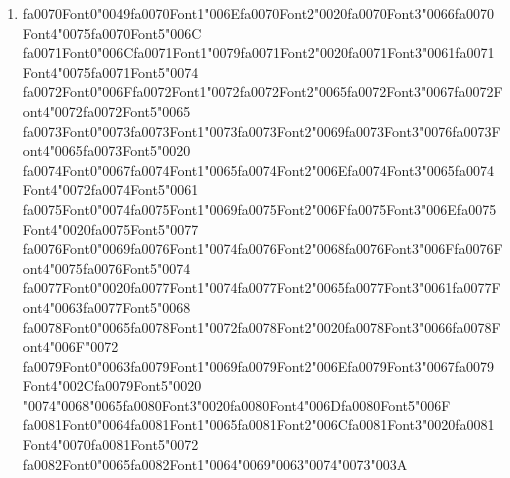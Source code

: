 \documentclass[11pt]{article}
\begin{document}
\begin{enumerate}[label=Q\arabic*., leftmargin=*]
\item {\csname fa0070Font0\endcsname\char"0049}{\csname fa0070Font1\endcsname\char"006E}{\csname fa0070Font2\endcsname\char"0020}{\csname fa0070Font3\endcsname\char"0066}{\csname fa0070Font4\endcsname\char"0075}{\csname fa0070Font5\endcsname\char"006C} {\csname fa0071Font0\endcsname\char"006C}{\csname fa0071Font1\endcsname\char"0079}{\csname fa0071Font2\endcsname\char"0020}{\csname fa0071Font3\endcsname\char"0061}{\csname fa0071Font4\endcsname\char"0075}{\csname fa0071Font5\endcsname\char"0074} {\csname fa0072Font0\endcsname\char"006F}{\csname fa0072Font1\endcsname\char"0072}{\csname fa0072Font2\endcsname\char"0065}{\csname fa0072Font3\endcsname\char"0067}{\csname fa0072Font4\endcsname\char"0072}{\csname fa0072Font5\endcsname\char"0065} {\csname fa0073Font0\endcsname\char"0073}{\csname fa0073Font1\endcsname\char"0073}{\csname fa0073Font2\endcsname\char"0069}{\csname fa0073Font3\endcsname\char"0076}{\csname fa0073Font4\endcsname\char"0065}{\csname fa0073Font5\endcsname\char"0020} {\csname fa0074Font0\endcsname\char"0067}{\csname fa0074Font1\endcsname\char"0065}{\csname fa0074Font2\endcsname\char"006E}{\csname fa0074Font3\endcsname\char"0065}{\csname fa0074Font4\endcsname\char"0072}{\csname fa0074Font5\endcsname\char"0061} {\csname fa0075Font0\endcsname\char"0074}{\csname fa0075Font1\endcsname\char"0069}{\csname fa0075Font2\endcsname\char"006F}{\csname fa0075Font3\endcsname\char"006E}{\csname fa0075Font4\endcsname\char"0020}{\csname fa0075Font5\endcsname\char"0077} {\csname fa0076Font0\endcsname\char"0069}{\csname fa0076Font1\endcsname\char"0074}{\csname fa0076Font2\endcsname\char"0068}{\csname fa0076Font3\endcsname\char"006F}{\csname fa0076Font4\endcsname\char"0075}{\csname fa0076Font5\endcsname\char"0074} {\csname fa0077Font0\endcsname\char"0020}{\csname fa0077Font1\endcsname\char"0074}{\csname fa0077Font2\endcsname\char"0065}{\csname fa0077Font3\endcsname\char"0061}{\csname fa0077Font4\endcsname\char"0063}{\csname fa0077Font5\endcsname\char"0068} {\csname fa0078Font0\endcsname\char"0065}{\csname fa0078Font1\endcsname\char"0072}{\csname fa0078Font2\endcsname\char"0020}{\csname fa0078Font3\endcsname\char"0066}{\csname fa0078Font4\endcsname\char"006F}{\char"0072} {\csname fa0079Font0\endcsname\char"0063}{\csname fa0079Font1\endcsname\char"0069}{\csname fa0079Font2\endcsname\char"006E}{\csname fa0079Font3\endcsname\char"0067}{\csname fa0079Font4\endcsname\char"002C}{\csname fa0079Font5\endcsname\char"0020} {\char"0074}{\char"0068}{\char"0065}{\csname fa0080Font3\endcsname\char"0020}{\csname fa0080Font4\endcsname\char"006D}{\csname fa0080Font5\endcsname\char"006F} {\csname fa0081Font0\endcsname\char"0064}{\csname fa0081Font1\endcsname\char"0065}{\csname fa0081Font2\endcsname\char"006C}{\csname fa0081Font3\endcsname\char"0020}{\csname fa0081Font4\endcsname\char"0070}{\csname fa0081Font5\endcsname\char"0072} {\csname fa0082Font0\endcsname\char"0065}{\csname fa0082Font1\endcsname\char"0064}{\char"0069}{\char"0063}{\char"0074}{\char"0073}{\char"003A}\\[0.25em]

\end{enumerate}
\end{document}
